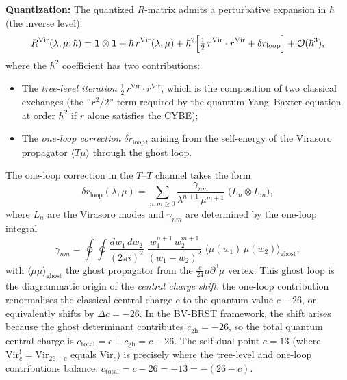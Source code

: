 \textbf{Quantization:} The quantized $R$-matrix admits a
perturbative expansion in $\hbar$ (the inverse level):
\begin{equation}
R^{\text{Vir}}(\lambda, \mu; \hbar)
= \mathbf{1} \otimes \mathbf{1}
 + \hbar\, r^{\text{Vir}}(\lambda,\mu)
 + \hbar^2 \Bigl[\tfrac{1}{2}\, r^{\text{Vir}} \cdot r^{\text{Vir}}
 + \delta r_{\text{loop}}\Bigr]
 + \mathcal{O}(\hbar^3),
\end{equation}
where the $\hbar^2$ coefficient has two contributions:
\begin{itemize}
\item The \emph{tree-level iteration}
$\tfrac{1}{2}\,r^{\text{Vir}} \cdot r^{\text{Vir}}$, which is
the composition of two classical exchanges (the ``$r^2/2$''
term required by the quantum Yang--Baxter equation at order
$\hbar^2$ if $r$ alone satisfies the CYBE);
\item The \emph{one-loop correction} $\delta r_{\text{loop}}$,
arising from the self-energy of the Virasoro propagator
$\langle T\mu \rangle$ through the ghost loop.
\end{itemize}

The one-loop correction in the $T$--$T$ channel takes the form
\begin{equation}
\delta r_{\text{loop}}(\lambda,\mu)
= \sum_{n,m \ge 0}
 \frac{\gamma_{nm}}{\lambda^{n+1}\,\mu^{m+1}}
 \;\bigl(L_n \otimes L_m\bigr),
\end{equation}
where $L_n$ are the Virasoro modes and $\gamma_{nm}$ are determined
by the one-loop integral
\[
\gamma_{nm}
= \oint \oint
 \frac{dw_1\, dw_2}{(2\pi i)^2}\;
 \frac{w_1^{n+1}\, w_2^{m+1}}{(w_1 - w_2)^2}
 \;\langle \mu(w_1)\, \mu(w_2) \rangle_{\text{ghost}},
\]
with $\langle \mu \mu \rangle_{\text{ghost}}$ the ghost propagator
from the $\tfrac{c}{24}\mu\partial^3\mu$ vertex. This ghost loop
is the diagrammatic origin of the \emph{central charge shift}:
the one-loop contribution renormalises the classical central charge
$c$ to the quantum value $c - 26$, or equivalently shifts by
$\Delta c = -26$. In the BV-BRST framework, the shift arises
because the ghost determinant contributes $c_{\text{gh}} = -26$,
so the total quantum central charge is $c_{\text{total}} = c + c_{\text{gh}} = c - 26$.
The self-dual point $c = 13$ (where
$\mathrm{Vir}_c^! = \mathrm{Vir}_{26-c}$ equals $\mathrm{Vir}_c$)
is precisely where the tree-level and one-loop contributions balance:
$c_{\text{total}} = c - 26 = -13 = -(26 - c)$.

